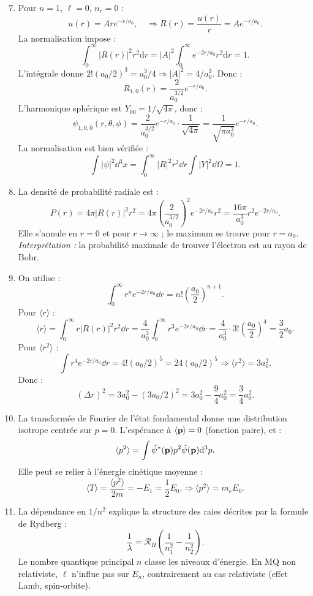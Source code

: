 \documentclass[a4paper,10pt]{report}
\begin{document}
	\begin{enumerate}
		\setcounter{enumi}{6}
		\item Pour $n=1$, $\ell=0$, $n_r=0$ :
		\[ u(r) = A r e^{-r/a_0}, \quad \Rightarrow R(r) = \frac{u(r)}{r} = A e^{-r/a_0}. \]
		La normalisation impose :
		\[
		\int_0^\infty |R(r)|^2 r^2 \text{d}r = |A|^2 \int_0^\infty e^{-2r/a_0} r^2 \text{d}r = 1.
		\]
		L'int\'egrale donne $2! (a_0/2)^3 = a_0^3/4 \Rightarrow |A|^2 = 4/a_0^3$.
		Donc :
		\[ R_{1,0}(r) = \frac{2}{a_0^{3/2}} e^{-r/a_0}. \]
		L'harmonique sph\'erique est $Y_{00} = 1/\sqrt{4\pi}$, donc :
		\[ \psi_{1,0,0}(r,\theta,\phi) = \frac{2}{a_0^{3/2}} e^{-r/a_0} \cdot \frac{1}{\sqrt{4\pi}} = \frac{1}{\sqrt{\pi a_0^3}} e^{-r/a_0}. \]
		La normalisation est bien v\'erifi\'ee :
		\[ \int |\psi|^2 \dd ^3x = \int_0^\infty |R|^2 r^2 \dd r \int |Y|^2 \dd \Omega = 1. \]
		
		\item La densit\'e de probabilit\'e radiale est :
		\[ P(r) = 4\pi |R(r)|^2 r^2 = 4\pi \left(\frac{2}{a_0^{3/2}}\right)^2 e^{-2r/a_0} r^2 = \frac{16\pi}{a_0^3} r^2 e^{-2r/a_0}. \]
		Elle s'annule en $r=0$ et pour $r \to \infty$ ; le maximum se trouve pour $r = a_0$.
		\emph{Interpr\'etation :} la probabilit\'e maximale de trouver l'\'electron est au rayon de Bohr.
		
		\item On utilise :
		\[ \int_0^\infty r^n e^{-2r/a_0} \dd r = n! \left(\frac{a_0}{2}\right)^{n+1}. \]
		Pour $\langle r \rangle$ :
		\[ \langle r \rangle = \int_0^\infty r |R(r)|^2 r^2 \dd r = \frac{4}{a_0^3} \int_0^\infty r^3 e^{-2r/a_0} \dd r = \frac{4}{a_0^3} \cdot 3! \left(\frac{a_0}{2}\right)^4 = \frac{3}{2} a_0. \]
		Pour $\langle r^2 \rangle$ :
		\[ \int r^4 e^{-2r/a_0} \dd r = 4! (a_0/2)^5 = 24(a_0/2)^5 \Rightarrow \langle r^2 \rangle = 3 a_0^2. \]
		Donc :
		\[ (\Delta r)^2 = 3a_0^2 - (3a_0/2)^2 = 3a_0^2 - \frac{9}{4}a_0^2 = \frac{3}{4}a_0^2. \]
		
		\item La transform\'ee de Fourier de l'\'etat fondamental donne une distribution isotrope centr\'ee sur $p=0$. L'esp\'erance \`a $\langle \vb{p} \rangle = 0$ (fonction paire), et :
		\[ \langle p^2 \rangle = \int \tilde\psi^*(\vb{p}) p^2 \tilde\psi(\vb{p}) \dd ^3p. \]
		Elle peut se relier \`a l'\'energie cin\'etique moyenne :
		\[ \langle T \rangle = \frac{\langle p^2 \rangle}{2m} = -E_1 = \frac{1}{2} E_0. \Rightarrow \langle p^2 \rangle = m_e E_0. \]
		
		\item La d\'ependance en $1/n^2$ explique la structure des raies d\'ecrites par la formule de Rydberg :
		\[ \frac{1}{\lambda} = \mathcal{R}_H\left(\frac{1}{n_1^2} - \frac{1}{n_2^2}\right). \]
		Le nombre quantique principal $n$ classe les niveaux d'\'energie. En MQ non relativiste, $\ell$ n'influe pas sur $E_n$, contrairement au cas relativiste (effet Lamb, spin-orbite).
	\end{enumerate}
	
\end{document}
